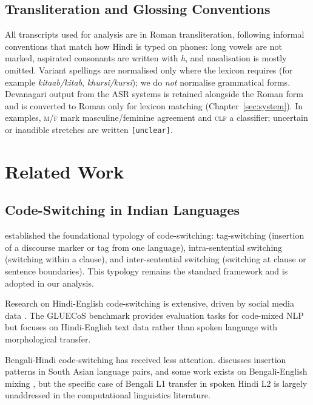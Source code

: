 \documentclass[11pt,a4paper]{report}
\begin{document}
\section{Transliteration and Glossing Conventions}

All transcripts used for analysis are in Roman transliteration, following informal conventions that match how Hindi is typed on phones: long vowels are not marked, aspirated consonants are written with \textit{h}, and nasalisation is mostly omitted. Variant spellings are normalised only where the lexicon requires (for example \textit{kitaab/kitab}, \textit{khursi/kursi}); we do \emph{not} normalise grammatical forms. Devanagari output from the ASR systems is retained alongside the Roman form and is converted to Roman only for lexicon matching (Chapter~\ref{sec:system}). In examples, \textsc{m}/\textsc{f} mark masculine/feminine agreement and \textsc{clf} a classifier; uncertain or inaudible stretches are written \texttt{[unclear]}.

\chapter{Related Work}
\label{sec:related}

\section{Code-Switching in Indian Languages}

\citet{poplack1980sometimes} established the foundational typology of code-switching: tag-switching (insertion of a discourse marker or tag from one language), intra-sentential switching (switching within a clause), and inter-sentential switching (switching at clause or sentence boundaries). This typology remains the standard framework and is adopted in our analysis.

Research on Hindi-English code-switching is extensive, driven by social media data \citep{bali2014borrowing, singh2018twitter, khanuja2020gluecos}. The GLUECoS benchmark \citep{khanuja2020gluecos} provides evaluation tasks for code-mixed NLP but focuses on Hindi-English text data rather than spoken language with morphological transfer.

Bengali-Hindi code-switching has received less attention. \citet{muysken2000bilingual} discusses insertion patterns in South Asian language pairs, and some work exists on Bengali-English mixing \citep{das2014identifying}, but the specific case of Bengali L1 transfer in spoken Hindi L2 is largely unaddressed in the computational linguistics literature.
\end{document}
